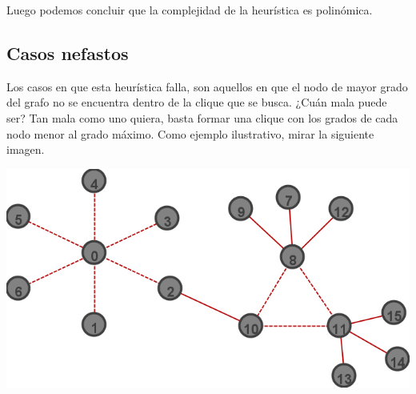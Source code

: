Luego podemos concluir que la complejidad de la heurística es polinómica. 


\subsection{Casos nefastos}

Los casos en que esta heurística falla, son aquellos en que el nodo de mayor grado del grafo no se encuentra dentro de la clique que se busca. 
¿Cuán mala puede ser? Tan mala como uno quiera, basta formar una clique con los grados de cada nodo menor al grado máximo. Como ejemplo ilustrativo, mirar la siguiente imagen.
\begin{center}
\includegraphics[scale=0.5]{goloso/labl.png} 
\end{center}
